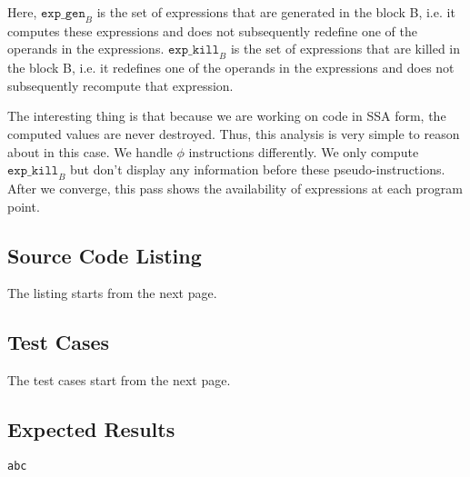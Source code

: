 Here,
$\texttt{exp_gen}_{B}$ is the set of expressions that are generated in the block B, i.e. it computes these
expressions and does not subsequently redefine one of the operands in the expressions.
$\texttt{exp_kill}_{B}$ is the set of expressions that are killed in the block B, i.e. it
redefines one of the operands in the expressions and does not subsequently recompute that expression.

The interesting thing is that because we are working on code in SSA form, the computed values are never
destroyed. Thus, this analysis is very simple to reason about in this case.
We handle $\phi$ instructions differently. We only compute $\texttt{exp_kill}_{B}$ but don't display any
information before these pseudo-instructions.
After we converge, this pass shows the availability of expressions at each program point.

\subsection{Source Code Listing}

The listing starts from the next page.



\subsection{Test Cases}

The test cases start from the next page.



\subsection{Expected Results}

\begingroup
\fontsize{6pt}{8pt}\selectfont
\begin{verbatim}
abc
\end{verbatim}
\endgroup

